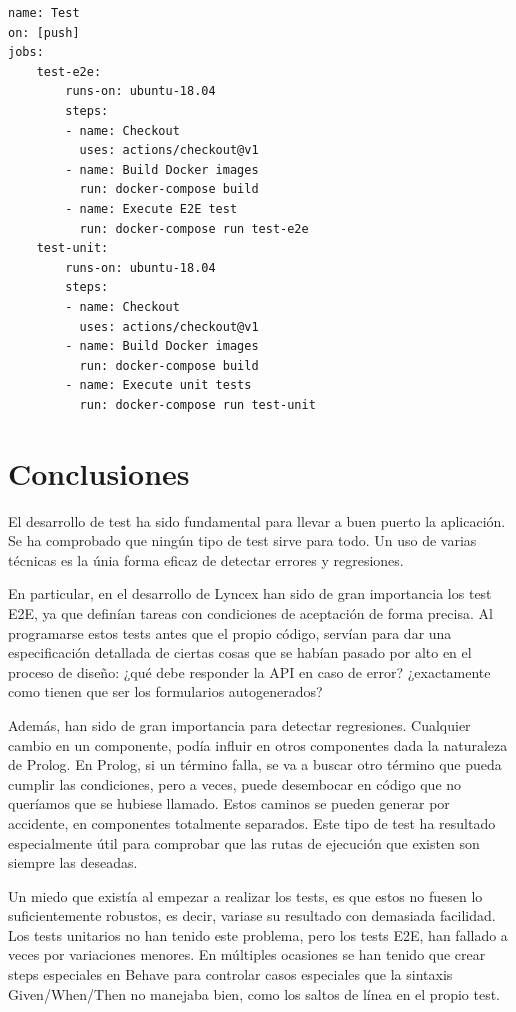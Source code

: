 \documentclass[12pt]{report} %
\begin{document}
\begin{lstlisting}
name: Test
on: [push]
jobs:
    test-e2e:
        runs-on: ubuntu-18.04
        steps:
        - name: Checkout
          uses: actions/checkout@v1
        - name: Build Docker images
          run: docker-compose build
        - name: Execute E2E test
          run: docker-compose run test-e2e
    test-unit:
        runs-on: ubuntu-18.04
        steps:
        - name: Checkout
          uses: actions/checkout@v1
        - name: Build Docker images
          run: docker-compose build
        - name: Execute unit tests
          run: docker-compose run test-unit
\end{lstlisting}

\section{Conclusiones}

El desarrollo de test ha sido fundamental para llevar a buen puerto la aplicación. Se ha comprobado que ningún tipo de test sirve para todo. Un uso de varias técnicas es la únia forma eficaz de detectar errores y regresiones.

En particular, en el desarrollo de Lyncex han sido de gran importancia los test E2E, ya que definían tareas con condiciones de aceptación de forma precisa. Al programarse estos tests antes que el propio código, servían para dar una especificación detallada de ciertas cosas que se habían pasado por alto en el proceso de diseño: ¿qué debe responder la API en caso de error? ¿exactamente como tienen que ser los formularios autogenerados?

Además, han sido de gran importancia para detectar regresiones. Cualquier cambio en un componente, podía influir en otros componentes dada la naturaleza de Prolog. En Prolog, si un término falla, se va a buscar otro término que pueda cumplir las condiciones, pero a veces, puede desembocar en código que no queríamos que se hubiese llamado. Estos caminos se pueden generar por accidente, en componentes totalmente separados. Este tipo de test ha resultado especialmente útil para comprobar que las rutas de ejecución que existen son siempre las deseadas.

Un miedo que existía al empezar a realizar los tests, es que estos no fuesen lo suficientemente robustos, es decir, variase su resultado con demasiada facilidad. Los tests unitarios no han tenido este problema, pero los tests E2E, han fallado a veces por variaciones menores. En múltiples ocasiones se han tenido que crear steps especiales en Behave para controlar casos especiales que la sintaxis Given/When/Then no manejaba bien, como los saltos de línea en el propio test.
\end{document}
